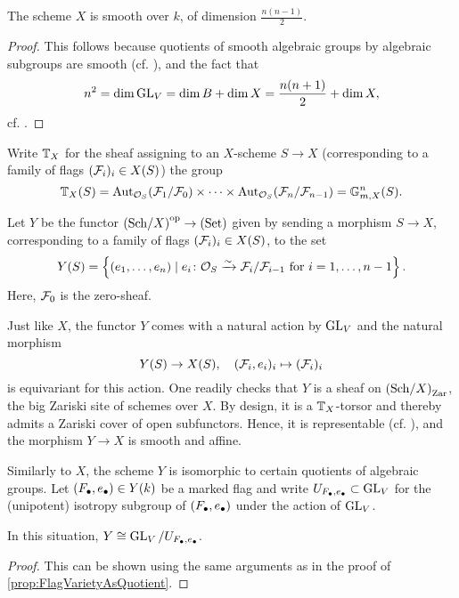 \documentclass[../main.tex]{subfiles}
\begin{document}
\begin{cor}\label{cor:XisSmoothAndOfDimension}
  The scheme $X$ is smooth over $k$, of dimension $\frac{n(n-1)}2$. 
\begin{proof}
  This follows because quotients of smooth algebraic groups by algebraic subgroups are 
  smooth (cf. \cite[Corollary 5.26]{milne2017algebraic}), and the fact that 
  $$n^2 = \dim \operatorname{GL}_V = \dim B + \dim X = \frac{n(n+1)}2 + \dim X,$$
  cf. \cite[Proposition 5.23]{milne2017algebraic}. 
\end{proof}
\end{cor}

Write $\mathbb{T}_X$ for the sheaf assigning to an $X$-scheme $S \to X$ (corresponding
to a  family of flags $(\mathcal{F}_i)_i \in X(S)$) the group 
$$\mathbb{T}_X(S) = \operatorname{Aut}_{\mathcal{O}_S}(\mathcal{F}_1/\mathcal{F}_0) \times \dots \times \operatorname{Aut}_{\mathcal{O}_S}(\mathcal{F}_n/\mathcal{F}_{n-1}) 
= \mathbb{G}_{m,X}^n(S).$$

\begin{defi}\label{def:MarkedFlagVar}
  Let $Y$ be the functor ${(\mathrm{Sch}/{X})}^{\mathrm{op}} \to {(\mathrm{Set})}$ given by sending a morphism
  $S \to X$, corresponding to a family of flags $(\mathcal{F}_i)_i \in X(S)$, to the set
  \begin{equation*}
    Y(S) = \left\{(e_1, \dots, e_n) \mid e_i\colon  \mathcal{O}_S \xrightarrow{\sim} 
    \mathcal{F}_i/\mathcal{F}_{i-1}\text{ for } i = 1, \dots, n-1\right \}.
  \end{equation*}
  Here, $\mathcal{F}_0$ is the zero-sheaf.
\end{defi}
Just like $X$, the functor $Y$ comes with a natural action by $\operatorname{GL}_V$
and the natural morphism
\begin{equation}\label{eq:naturalmapYtoX}
  Y(S) \to X(S), \quad (\mathcal{F}_i, e_i)_i \mapsto (\mathcal{F}_i)_i
\end{equation}
is equivariant for this action. One readily checks that $Y$ is a sheaf on
${(\mathrm{Sch}/{X})}_{\mathrm{Zar}}$, the big Zariski site of schemes over $X$. 
By design, it is a $\mathbb{T}_X$-torsor and thereby admits a Zariski cover of open
subfunctors. Hence, it is representable (cf. \cite[Theorem
8.9]{gortz2020algebraic}), and the morphism $Y \to X$ is smooth and affine.

Similarly to $X$, the scheme $Y$ is isomorphic to certain quotients of
algebraic groups.
Let $(F_\bullet,e_\bullet) \in Y(k)$ be a marked flag and write
$U_{F_\bullet, e_\bullet} \subset \operatorname{GL}_V$ for the (unipotent) isotropy subgroup of
$(F_\bullet, e_\bullet)$ under the action of $\operatorname{GL}_V$. 
\begin{lem}\label{lem:MarkedFlagVarietyAsQuotient}
  In this situation, $Y \cong \operatorname{GL}_V/U_{F_\bullet, e_\bullet}$.
\begin{proof}
  This can be shown using the same arguments as in the proof of \cref{prop:FlagVarietyAsQuotient}.
\end{proof}
\end{lem}
\end{document}
